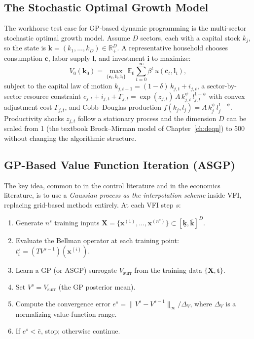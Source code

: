 \documentclass[11pt,a4paper]{report}
\newcommand{\x}{\bm{x}}
\newcommand{\X}{\bm{X}}
\newcommand{\R}{\mathbb{R}}
\begin{document}
\subsection{The Stochastic Optimal Growth Model}
\label{sec:growth_model}

The workhorse test case for GP-based dynamic programming is the multi-sector stochastic optimal growth model.  Assume $D$ sectors, each with a capital stock $k_j$, so the state is $\bm{k} = (k_1, \ldots, k_D) \in \R^D_+$.  A representative household chooses consumption $\bm{c}$, labor supply $\bm{l}$, and investment $\bm{i}$ to maximize:
\begin{equation}
V_0(\bm{k}_0) = \max_{\{\bm{c}_t, \bm{l}_t, \bm{i}_t\}} \mathbb{E}_0 \sum_{t=0}^\infty \beta^t\, u(\bm{c}_t, \bm{l}_t),
\label{eq:growth_bellman}
\end{equation}
subject to the capital law of motion $k_{j,t+1} = (1-\delta)\,k_{j,t} + i_{j,t}$, a sector-by-sector resource constraint $c_{j,t} + i_{j,t} + \Gamma_{j,t} = \exp(z_{j,t})\,A\,k_{j,t}^\psi\,l_{j,t}^{1-\psi}$ with convex adjustment cost $\Gamma_{j,t}$, and Cobb--Douglas production $f(k_j, l_j) = A\,k_j^\psi\,l_j^{1-\psi}$.  Productivity shocks $z_{j,t}$ follow a stationary process and the dimension $D$ can be scaled from 1 (the textbook Brock--Mirman model of Chapter~\ref{ch:deqn}) to 500 without changing the algorithmic structure.

\subsection{GP-Based Value Function Iteration (ASGP)}
\label{sec:asgp_vfi}

The key idea, common to \citet{deisenroth2009gaussian} in the control literature and \citet{SCHEIDEGGER201968} in the economics literature, is to use a \emph{Gaussian process as the interpolation scheme} inside VFI, replacing grid-based methods entirely.  At each VFI step $s$:
\begin{enumerate}[itemsep=2pt]
\item Generate $n^s$ training inputs $\X = \{\x^{(1)}, \ldots, \x^{(n^s)}\} \subset [\underline{\bm{k}}, \bar{\bm{k}}]^D$.
\item Evaluate the Bellman operator at each training point: $t_i^s = (TV^{s-1})(\x^{(i)})$.
\item Learn a GP (or ASGP) surrogate $V_\mathrm{surr}$ from the training data $\{\X, \bm{t}\}$.
\item Set $V^s = V_\mathrm{surr}$ (the GP posterior mean).
\item Compute the convergence error $e^s = \|V^s - V^{s-1}\|_\infty / \Delta_V$, where $\Delta_V$ is a normalizing value-function range.
\item If $e^s < \bar{e}$, stop; otherwise continue.
\end{enumerate}
\end{document}
